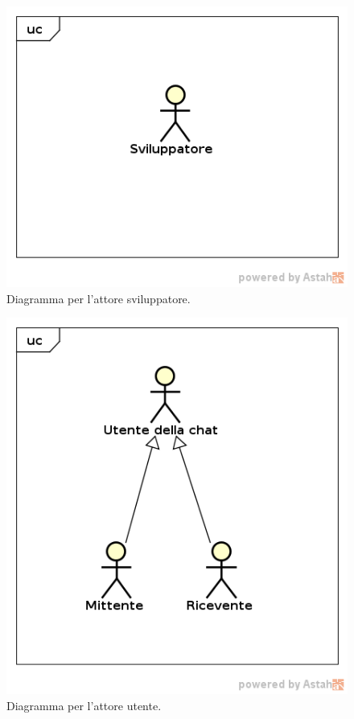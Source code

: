    \FloatBarrier
   \begin{figure}[ht]
   \centering
   \includegraphics[scale=0.45]{img/solo_attori_sviluppatore.png}
   \caption{Diagramma per l'attore sviluppatore.}
\end{figure}


   \FloatBarrier
   \begin{figure}[ht]
   \centering
   \includegraphics[scale=0.45]{img/solo_attori_utente.png}
   \caption{Diagramma per l'attore utente.}
\end{figure}

